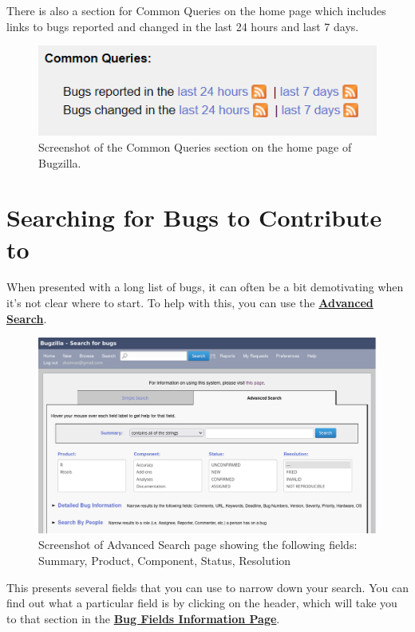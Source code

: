 \documentclass[
]{book}
\begin{document}
There is also a section for Common Queries on the home page which includes links to bugs reported and changed in the last 24 hours and last 7 days.

\begin{figure}
\centering
\includegraphics{img/commonquery.png}
\caption{Screenshot of the Common Queries section on the home page of Bugzilla.}
\end{figure}

\section{Searching for Bugs to Contribute to}\label{searching}

When presented with a long list of bugs, it can often be a bit demotivating when it's not clear where to start.
To help with this, you can use the \href{https://bugs.r-project.org/query.cgi?format=advanced}{\textbf{Advanced Search}}.

\begin{figure}
\centering
\includegraphics{img/bugzilla-adv-search-home.png}
\caption{Screenshot of Advanced Search page showing the following fields: Summary, Product, Component, Status, Resolution}
\end{figure}

This presents several fields that you can use to narrow down your search.
You can find out what a particular field is by clicking on the header, which will take you to that section in the \href{https://bugs.r-project.org/page.cgi?id=fields.html}{\textbf{Bug Fields Information Page}}.
\end{document}
